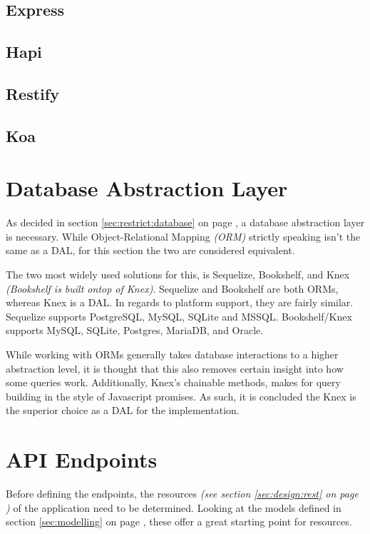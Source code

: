 		\subsection{Express}
		\subsection{Hapi}
		\subsection{Restify}
		\subsection{Koa}


	\section{Database Abstraction Layer}
		As decided in section \ref{sec:restrict:database} on page \pageref{sec:restrict:database}, a database abstraction layer is necessary. While Object-Relational Mapping \emph{(ORM)} strictly speaking isn't the same as a DAL, for this section the two are considered equivalent.

		The two most widely used solutions for this, is Sequelize, Bookshelf, and Knex \emph{(Bookshelf is built ontop of Knex)}. Sequelize and Bookshelf are both ORMs, whereas Knex is a DAL. In regards to platform support, they are fairly similar. Sequelize supports PostgreSQL, MySQL, SQLite and MSSQL. Bookshelf/Knex supports MySQL, SQLite, Postgres, MariaDB, and Oracle.

		While working with ORMs generally takes database interactions to a higher abstraction level, it is thought that this also removes certain insight into how some queries work. Additionally, Knex's chainable methods, makes for query building in the style of Javascript promises. As such, it is concluded the Knex is the superior choice as a DAL for the implementation.

	\section{API Endpoints}
		\label{sec:api}
		Before defining the endpoints, the resources \emph{(see section \ref{sec:design:rest} on page \pageref{sec:design:rest})} of the application need to be determined. Looking at the models defined in section \ref{sec:modelling} on page \pageref{sec:modelling}, these offer a great starting point for resources.


